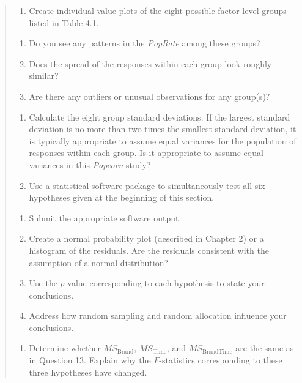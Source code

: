 \documentclass[
]{report}
\providecommand{\tightlist}{%
  \setlength{\itemsep}{0pt}\setlength{\parskip}{0pt}}
\begin{document}
\begin{quote}
\begin{enumerate}
\def\labelenumi{\arabic{enumi}.}
\setcounter{enumi}{15}
\tightlist
\item
  Create individual value plots of the eight possible factor-level groups listed in Table 4.1.
\end{enumerate}

\begin{enumerate}
\def\labelenumi{\alph{enumi}.}
\tightlist
\item
  Do you see any patterns in the \emph{PopRate} among these groups?
\item
  Does the spread of the responses within each group look roughly similar?
\item
  Are there any outliers or unusual observations for any group(s)?
\end{enumerate}

\begin{enumerate}
\def\labelenumi{\arabic{enumi}.}
\setcounter{enumi}{16}
\tightlist
\item
  Calculate the eight group standard deviations. If the largest standard deviation is no more than two times the smallest standard deviation, it is typically appropriate to assume equal variances for the population of responses within each group. Is it appropriate to assume equal variances in this \emph{Popcorn} study?
\item
  Use a statistical software package to simultaneously test all six hypotheses given at the beginning of this section.
\end{enumerate}

\begin{enumerate}
\def\labelenumi{\alph{enumi}.}
\tightlist
\item
  Submit the appropriate software output.
\item
  Create a normal probability plot (described in Chapter 2) or a histogram of the residuals. Are the residuals consistent with the assumption of a normal distribution?
\item
  Use the \(p\)-value corresponding to each hypothesis to state your conclusions.
\item
  Address how random sampling and random allocation influence your conclusions.
\end{enumerate}

\begin{enumerate}
\def\labelenumi{\arabic{enumi}.}
\setcounter{enumi}{18}
\tightlist
\item
  Determine whether \(MS_{\text{Brand}}\), \(MS_{\text{Time}}\), and \(MS_{\text{BrandTime}}\) are the same as in Question 13. Explain why the \(F\)-statistics corresponding to these three hypotheses have changed.
\end{enumerate}
\end{quote}
\end{document}
